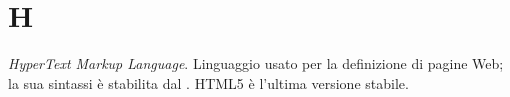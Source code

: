\section{H}

\textit{HyperText Markup Language}. Linguaggio usato per la definizione di pagine Web; la sua sintassi è stabilita dal .
HTML5 è l'ultima versione stabile.



